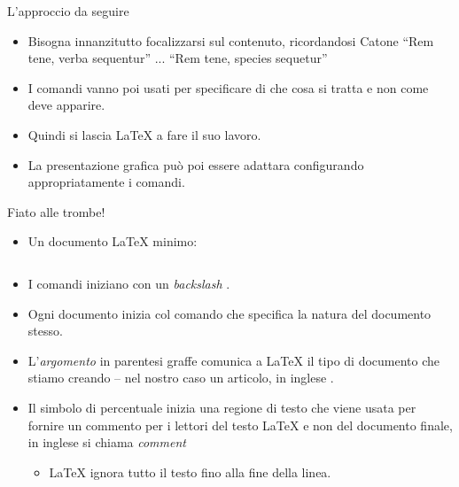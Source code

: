 \documentclass{beamer}
\begin{document}
\begin{frame}[fragile]{\centerline{L'approccio da seguire}}

\begin{itemize}
\item Bisogna innanzitutto focalizzarsi sul contenuto, ricordandosi Catone ``Rem tene, verba sequentur'' ... ``Rem tene, species sequetur''
\item I comandi vanno poi usati per specificare di che cosa si tratta e non come deve apparire.
\item Quindi si lascia \LaTeX{} a fare il suo lavoro.
\item La presentazione grafica pu\`{o} poi essere adattara configurando appropriatamente i comandi.
\end{itemize}
\end{frame}


\begin{frame}[fragile]{\centerline{Fiato alle trombe!}}
\begin{itemize}
\item Un documento \LaTeX{} minimo:
\inputminted[frame=single]{latex}{A2022.IDSEPCLaTeX/minimale.tex}
\item I comandi iniziano con un \emph{backslash} \keystrokebftt{\bs}.
\item Ogni documento inizia col comando  che specifica la natura del documento stesso.
\item L'\emph{argomento} in parentesi graffe \keystrokebftt{\{} \keystrokebftt{\}} comunica a \LaTeX{} il tipo di documento che stiamo creando -- nel nostro caso un articolo, in inglese .
\item Il simbolo di percentuale \keystrokebftt{\%} inizia una regione di testo che viene usata per fornire un commento per i lettori del testo \LaTeX{} e non del documento finale, in inglese si chiama \emph{comment} 
\begin{itemize}
\item \LaTeX{} ignora tutto il testo fino alla fine della linea.
\end{itemize}
\end{itemize}
\end{frame}
\end{document}
